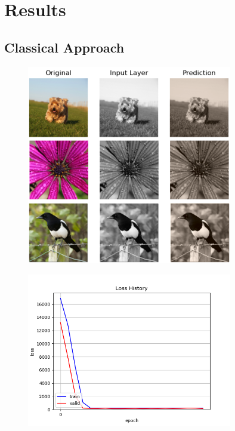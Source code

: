 \documentclass[12pt,letterpaper]{article}
\begin{document}
\section{Results}
\subsection{Classical Approach}
\begin{figure}
	\centering
	\includegraphics[width=0.8\textwidth]{class_predict.png}
	\caption{}
	\label{class}
\end{figure}

\begin{figure}[h!]
	\centering
	\includegraphics[width=0.8\textwidth]{loss_classical.png}
	\caption{}
	\label{loss_class}
\end{figure}
\end{document}
